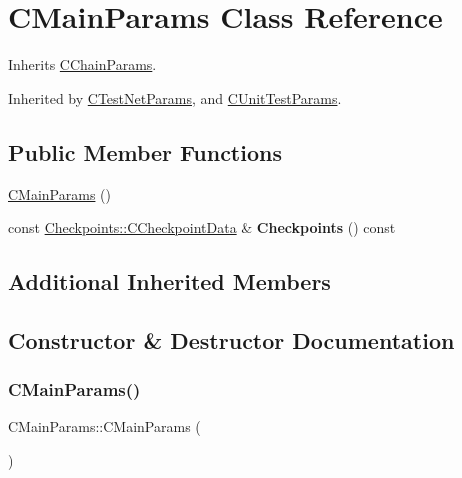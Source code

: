 \hypertarget{class_c_main_params}{}\section{C\+Main\+Params Class Reference}
\label{class_c_main_params}


Inherits \mbox{\hyperlink{class_c_chain_params}{C\+Chain\+Params}}.



Inherited by \mbox{\hyperlink{class_c_test_net_params}{C\+Test\+Net\+Params}}, and \mbox{\hyperlink{class_c_unit_test_params}{C\+Unit\+Test\+Params}}.

\subsection*{Public Member Functions}
\begin{DoxyCompactItemize}
\item 
\mbox{\hyperlink{class_c_main_params_ab7dfebf3c4dd5cc0ebdfabe1111056d6}{C\+Main\+Params}} ()
\item 
\mbox{\label{class_c_main_params_a7c74a76c96714b533ac485e2e9b25f15}} 
const \mbox{\hyperlink{struct_checkpoints_1_1_c_checkpoint_data}{Checkpoints\+::\+C\+Checkpoint\+Data}} \& {\bfseries Checkpoints} () const
\end{DoxyCompactItemize}
\subsection*{Additional Inherited Members}


\subsection{Constructor \& Destructor Documentation}
\mbox{\label{class_c_main_params_ab7dfebf3c4dd5cc0ebdfabe1111056d6}} 
\subsubsection{\texorpdfstring{CMainParams()}{CMainParams()}}
{\footnotesize\ttfamily C\+Main\+Params\+::\+C\+Main\+Params (\begin{DoxyParamCaption}{ }\end{DoxyParamCaption})\hspace{0.3cm}{\ttfamily [inline]}}


